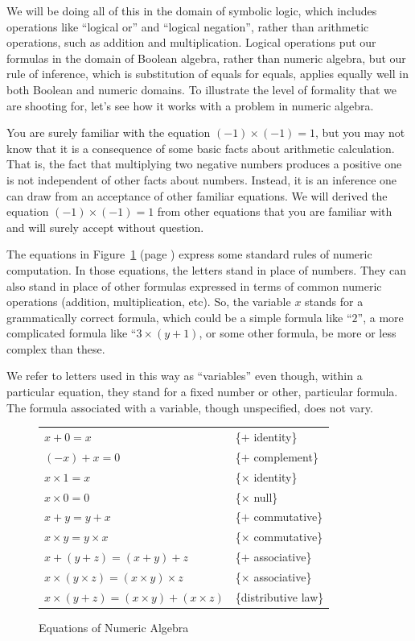 We will be doing all of this in the domain of symbolic logic, which
includes operations like ``logical or'' and ``logical negation'',
rather than arithmetic operations, such as addition and
multiplication. Logical operations put our formulas in the
domain of Boolean algebra, rather than numeric algebra, but
our rule of inference, which is substitution of equals for equals,
applies equally well in both Boolean and numeric domains.
To illustrate the level of formality that we are shooting for,
let's see how it works with a problem in numeric algebra.

You are surely familiar with the equation $(-1)\times(-1) = 1$, but you may
not know that it is a consequence of some basic facts about
arithmetic calculation.
That is, the fact that multiplying two
negative numbers produces a positive one
is not independent of other facts about numbers.
Instead, it is an inference one can draw
from an acceptance of other familiar equations.
We will derived the equation $(-1)\times(-1) = 1$
from other equations that you are familiar with
and will surely accept without question.

The equations in Figure~\ref{fig-02-01} (page \pageref{fig-02-01})
express some standard rules of numeric computation.
In those equations, the letters stand in
place of numbers. They can also stand in place of other
formulas expressed in terms of common numeric operations (addition,
multiplication, etc).
So, the variable $x$ stands for a grammatically correct formula,
which could be a simple formula like ``$2$'',
a more complicated formula like ``$3\times(y + 1)$,
or some other formula, be more or less complex than these.

We refer to letters used in this way as
``variables'' even though, within a particular equation, they
stand for a fixed number or other, particular formula.
The formula associated with a variable, though unspecified, does not vary.

\begin{figure}
\begin{center}
\begin{tabular}{ll}
$x+0 = x$                 & \{$+$ identity\} \\
$(-x)+ x = 0$             & \{$+$ complement\} \\
$x \times 1 = x$          & \{$\times$ identity\} \\
$x \times 0 = 0$          & \{$\times$ null\} \\
$x+y = y+x$               & \{$+$ commutative\} \\
$x \times y = y \times x$ & \{$\times$ commutative\} \\
$x+(y+z) = (x+y)+z$       & \{$+$ associative\} \\
$x \times (y \times z) = (x \times y) \times z$ & \{$\times$ associative\} \\
$x\times(y+z) = (x \times y)+(x \times z)$      & \{distributive law\} \\
\end{tabular}
\end{center}
\caption{Equations of Numeric Algebra}
\label{fig-02-01}
\end{figure}

